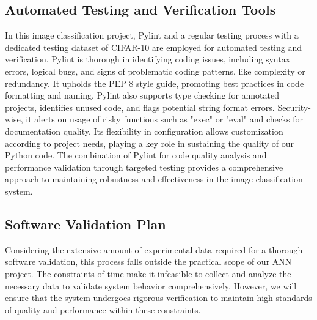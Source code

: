 \documentclass[12pt, titlepage]{article}
\begin{document}
\subsection{Automated Testing and Verification Tools}\label{AutoTestVerTools}

In this image classification project, Pylint \citep{pylint} and a regular testing process with a 
dedicated testing dataset of CIFAR-10 \citep{CIFAR10} are employed for automated testing and verification. 
Pylint \citep{pylint} is thorough in identifying coding issues, including syntax errors, 
logical bugs, and signs of problematic coding patterns, like complexity or redundancy. 
It upholds the PEP 8 style guide, promoting best practices in code formatting and naming. 
Pylint \citep{pylint} also supports type checking for annotated projects, identifies unused 
code, and flags potential string format errors. Security-wise, it alerts on usage of risky 
functions such as "exec" or "eval" and checks for documentation quality. Its flexibility 
in configuration allows customization according to project needs, playing a key role in 
sustaining the quality of our Python code. The combination of 
Pylint \citep{pylint} for code quality analysis and performance validation through targeted testing 
provides a comprehensive approach to maintaining robustness and effectiveness in the 
image classification system.




\subsection{Software Validation Plan}\label{SoftwareValPlan}

Considering the extensive amount of experimental data required for a thorough software 
validation, this process falls outside the practical scope of our ANN project. 
The constraints of time make it infeasible to collect and analyze the necessary 
data to validate system behavior comprehensively. However, we will ensure that the 
system undergoes rigorous verification to maintain high standards of quality and 
performance within these constraints.
\end{document}
